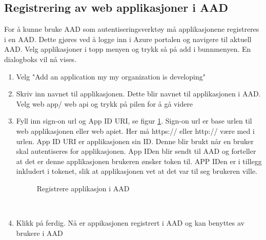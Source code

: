 \subsection{Registrering av web applikasjoner i AAD}
\label{subsec:veiledninger_brukerveiledningForWebApplikasjon_registreringAvWebApplikasjoneriAad}
For å kunne bruke AAD som autentiseringsverktøy må applikasjonene registreres i en AAD. Dette gjøres ved å logge inn i Azure portalen og navigere til aktuell AAD. Velg applikasjoner i topp menyen og trykk så på add i bunnmenyen. En dialogboks vil nå vises.
\\
\begin{enumerate}
\item Velg "Add an application my my organization is developing"
\\
\item Skriv inn navnet til applikasjonen. Dette blir navnet til applikasjonen i AAD. Velg web app/ web api og trykk på pilen for å gå videre
\\
\item Fyll inn sign-on url og App ID URI, se figur \ref{fig:registrereAppIAAD}. Sign-on url er base urlen til web applikasjonen eller web apiet. Her må https:// eller http:// være med i urlen. App ID URI er applikasjonen sin ID. Denne blir brukt når en bruker skal autentiseres for applikasjonen. App IDen blir sendt til AAD og forteller at det er denne applikasjonen brukeren ønsker token til. APP IDen er i tillegg inkludert i tokenet, slik at applikasjonen vet at det var til seg brukeren ville.
\pagebreak
\begin{figure}[!htbp]
\begin{center}
    {%
    \setlength{\fboxsep}{0pt}%
    \setlength{\fboxrule}{0.5pt}%
    }%
    \caption{Registrere applikasjon i AAD}
    \label{fig:registrereAppIAAD}
    \end{center}
\end{figure}
\\
\item Klikk på ferdig. Nå er appikasjonen registrert i AAD og kan benyttes av brukere i AAD
\end{enumerate}


